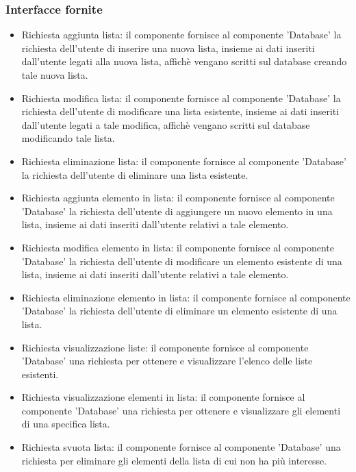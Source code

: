\documentclass[a4paper,12pt]{article}
\begin{document}
\subsubsection*{Interfacce fornite}
\begin{itemize} \setlength\itemsep{0.01em}
\item {\sffamily Richiesta aggiunta lista}: il componente fornisce al componente 'Database' la richiesta dell'utente di inserire una nuova lista, insieme ai dati inseriti dall'utente legati alla nuova lista, affichè vengano scritti sul database creando tale nuova lista.
\item {\sffamily Richiesta modifica lista}: il componente fornisce al componente 'Database'  la richiesta dell'utente di modificare una lista esistente, insieme ai dati inseriti dall'utente legati a tale modifica, affichè vengano scritti sul database modificando tale lista.
\item {\sffamily Richiesta eliminazione lista}: il componente fornisce al componente 'Database'  la richiesta dell'utente di eliminare una lista esistente.
\item {\sffamily Richiesta aggiunta elemento in lista}: il componente fornisce al componente 'Database' la richiesta dell'utente di aggiungere un nuovo elemento in una lista, insieme ai dati inseriti dall'utente relativi a tale elemento.
\item {\sffamily Richiesta modifica elemento in lista}: il componente fornisce al componente 'Database' la richiesta dell'utente di modificare un elemento  esistente di una lista, insieme ai dati inseriti dall'utente relativi a tale elemento.
\item {\sffamily Richiesta eliminazione elemento in lista}: il componente fornisce al componente 'Database' la richiesta dell'utente di eliminare un elemento esistente di una lista.
\item {\sffamily Richiesta visualizzazione liste}: il componente fornisce al componente 'Database' una richiesta per ottenere e visualizzare l'elenco delle liste esistenti.
\item {\sffamily Richiesta visualizzazione elementi in lista}: il componente fornisce al componente 'Database' una richiesta per ottenere e visualizzare gli elementi di una specifica lista.
\item {\sffamily Richiesta svuota lista}: il componente fornisce al componente 'Database' una richiesta per eliminare gli elementi della lista di cui non ha più interesse.
\end{itemize}
\end{document}
